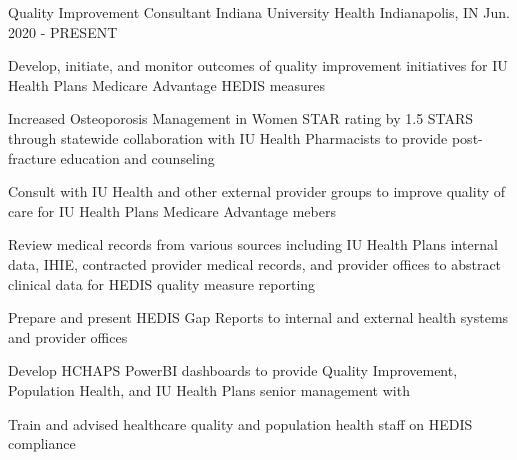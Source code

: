 

\begin{cventries}


  \cventry
    {Quality Improvement Consultant} %
    {Indiana University Health} %
    {Indianapolis, IN} %
    {Jun. 2020 - PRESENT} %
    {
      \begin{cvitems} %
        \item {Develop, initiate, and monitor outcomes of quality improvement initiatives for IU Health Plans Medicare Advantage HEDIS measures}
        \item {Increased Osteoporosis Management in Women STAR rating by 1.5 STARS through statewide collaboration with IU Health Pharmacists to provide post-fracture education and counseling}
        \item {Consult with IU Health and other external provider groups to improve quality of care for IU Health Plans Medicare Advantage mebers}
        \item {Review medical records from various sources including IU Health Plans internal data, IHIE, contracted provider medical records, and provider offices to abstract clinical data for HEDIS quality measure reporting}
        \item {Prepare and present HEDIS Gap Reports to internal and external health systems and provider offices}
        \item {Develop HCHAPS PowerBI dashboards to provide Quality Improvement, Population Health, and IU Health Plans senior management with }
        \item {Train and advised healthcare quality and population health staff on HEDIS compliance}
  \end{cvitems}
    }



\end{cventries}
